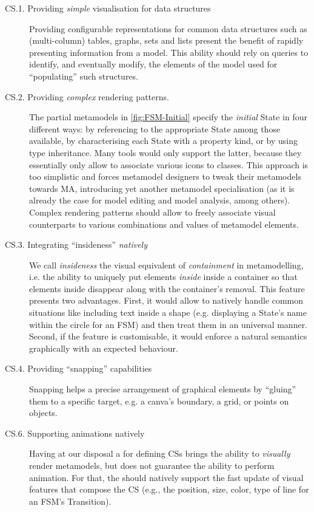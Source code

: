 \begin{description}
   \item[CS.1. Providing \emph{simple} visualisation for data structures] 
   Pro\-vi\-ding configurable representations for common data structures such as
   (multi-column) tables, graphs, sets and lists present the benefit of rapidly
   presenting information from a model. This ability should rely on queries to
   identify, and eventually modify, the elements of the model used for ``populating''
   such structures. 

	\item[CS.2. Providing \emph{complex} rendering patterns.]
   The partial meta\-models in \autoref{fig:FSM-Initial} 
   specify the \emph{initial} \textsf{State} in four different ways: by referencing
   to the appropriate \textsf{State} among those available, by characterising each \textsf{State} with
   a property \textsf{kind}, or by using type inheritance. Many tools would only
   support the latter, because they essentially only allow to 
   associate various icons to classes. This approach is too simplistic and forces
   metamodel designers to tweak their metamodels towards MA, introducing yet another
   metamodel specialisation (as it is already the case for model editing and
   model analysis, among others). Complex rendering patterns should allow to freely
   associate visual counterparts to various combinations and values of metamodel
   elements.
   
   \item[CS.3. Integrating ``insideness'' \emph{natively}] We call \emph{insideness}
   the visual equivalent of \emph{containment} in metamodelling, i.e. the ability
   to uniquely put elements \emph{inside} inside a container so that elements 
   inside disappear along with the container's removal. This feature presents two
   advantages. First, it would allow to natively handle common situations like 
   including text inside a shape (e.g. displaying a \textsf{State}'s name within
   the circle for an \textsf{FSM}) and then treat them in an universal manner. 
   Second, if the feature is customisable, it would enforce a natural semantics
   graphically with an expected behaviour. 
   
   \item[CS.4. Providing ``snapping'' capabilities] Snapping helps a precise arrangement
   of graphical elements by ``gluing'' them to a specific target, e.g. a canva's
   boundary, a grid, or points on objects. 
      
   \item[CS.6. Supporting animations natively] Having at our disposal a \DSL
   for defining CSs brings the ability to \emph{visually} render metamodels, but
   does not guarantee the ability to perform animation. For that, the \DSL should
   natively support the fast update of visual features that compose the CS (e.g.,
   the position, size, color, type of line for an \textsf{FSM}'s 
   \textsf{Transition}).      
\end{description}


